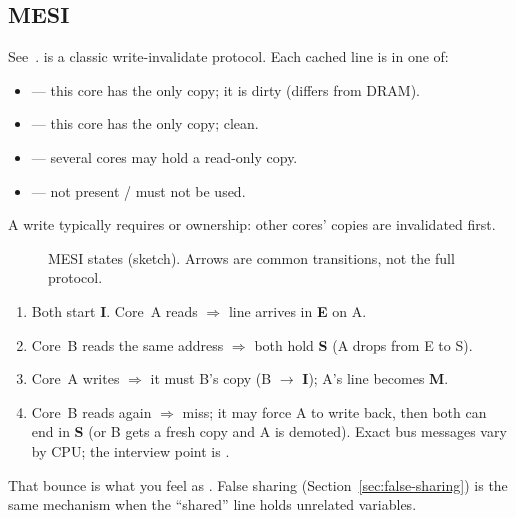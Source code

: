 \subsection{MESI}
\label{subsec:mesi}
See~\cite{intel-mesif}.
\newline
{} is a classic write-invalidate protocol. Each cached line is in one of:
\begin{itemize}
    \item {} --- this core has the only copy; it is dirty (differs from DRAM).
    \item {} --- this core has the only copy; clean.
    \item {} --- several cores may hold a read-only copy.
    \item {} --- not present / must not be used.
\end{itemize}
A write typically requires  or  ownership: 
other cores' copies are invalidated first.

\begin{figure}[H]
\centering

\caption{MESI states (sketch). Arrows are common transitions, not the full protocol.}
\label{fig:mesi-protocol}
\end{figure}

\begin{enumerate}
    \item Both start \textbf{I}. Core~A reads $\Rightarrow$ line arrives in \textbf{E} on A.
    \item Core~B reads the same address $\Rightarrow$ both hold \textbf{S} (A drops from E to S).
    \item Core~A writes $\Rightarrow$ it must  B's copy (B $\rightarrow$ \textbf{I}); 
          A's line becomes \textbf{M}.
    \item Core~B reads again $\Rightarrow$ miss; it may force A to write back, then both can end in 
          \textbf{S} (or B gets a fresh copy and A is demoted). Exact bus messages vary by CPU; 
          the interview point is .
\end{enumerate}
That bounce is what you feel as . False sharing 
(Section~\ref{sec:false-sharing}) is the same mechanism when the ``shared'' line 
holds unrelated variables.

